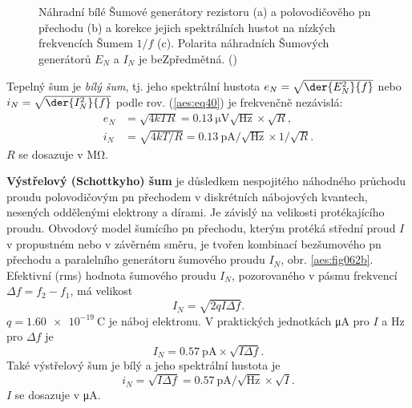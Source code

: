         \begin{figure}[ht!]  %
          \centering
                   \\                                           
                   \\    
          \caption{ Náhradní bílé Šumové generátory rezistoru (a) a polovodičověho pn přechodu (b)
                    a korekce jejich spektrálních hustot na nízkých frekvencích Šumem \(1/f\) (c).
                    Polarita náhradních Šumových generátorů \(E_N\) a \(I_N\) je beZpředmětná.
                    (\cite[s.~49]{Dostal})}
          \label{aes:fig062}
        \end{figure}

        Tepelný šum je \emph{bílý šum}, tj. jeho spektrální hustota \(e_N =
        \sqrt{\der{E_N^2}{f}}\) nebo \(i_N = \sqrt{\der{I_N^2}{f}}\) podle rov. (\ref{aes:eq40})
        je frekvenčně nezávislá:
        \begin{equation}\label{aes:eq074} 
          \begin{split}
            e_N &= \sqrt{4kTR}  = \SI{0.13}{\uV}\sqrt{\si{\Hz}}\times\sqrt{R},                 \\
            i_N &= \sqrt{4kT/R} = \SI{0.13}{\pA}/\sqrt{\si{\Hz}}\times1/\sqrt{R}.
          \end{split}
        \end{equation}
        \(R\) se dosazuje v \si{\mega\ohm}.

        \textbf{Výstřelový (Schottkyho) šum} je důsledkem nespojitého náhodného průchodu proudu
        polovodičovým pn přechodem v diskrétních nábojových kvantech, nesených oddělenými elektrony
        a dírami. Je závislý na velikosti protékajícího proudu. Obvodový model šumícího pn přechodu,
        kterým protéká střední proud \(I\) v propustném nebo v závěrném směru, je tvořen kombinací
        bezšumového pn přechodu a paralelního generátoru šumového proudu \(I_N\), obr.
        \ref{aes:fig062b}. Efektivní (rms) hodnota šumového proudu \(I_N\), pozorovaného v pásmu
        frekvencí \(\Delta f = f_2 - f_1\), má velikost
        \begin{equation}\label{aes:eq075}
          I_N = \sqrt{2qI\Delta f}.
        \end{equation}
        \(q = \SI{1.60e-19}{\coulomb}\) je náboj elektronu. V praktických jednotkách \si{\uA} pro
        \(I\) a \si{\Hz} pro \(\Delta f\) je
        \begin{equation}\label{aes:eq076}
          I_N = \SI{0.57}{\pA}\times\sqrt{I\Delta f}.
        \end{equation}
        Také výstřelový šum je bílý a jeho spektrální hustota je 
        \begin{equation}\label{aes:eq077}
          i_N = \sqrt{I\Delta f} = \SI{0.57}{\pA}/\sqrt{\si{\Hz}}\times\sqrt{I}.
        \end{equation}
        \(I\) se dosazuje v \si{\uA}.

